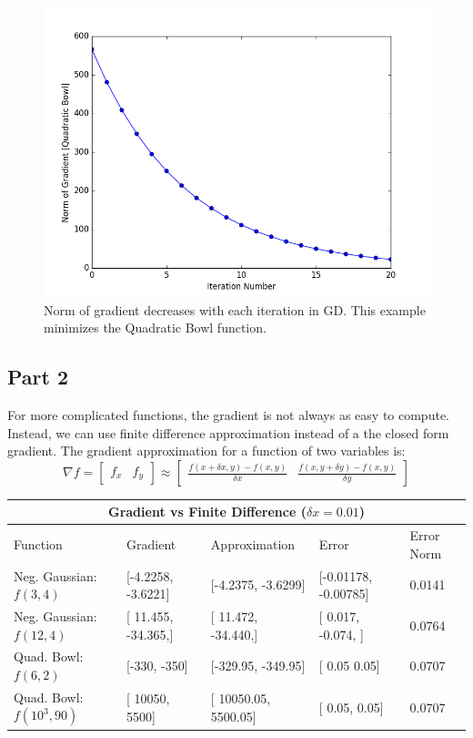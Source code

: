 \begin{figure}
	\centering
	\includegraphics [trim=0 0 0 0, clip, angle=0, width=0.8\columnwidth,
	keepaspectratio]{figures/1_1_gradient}
	\caption{Norm of gradient decreases with each iteration in GD. This example minimizes the Quadratic Bowl function.} 
	\label{fig:gradient} 
\end{figure}


\subsection{Part 2}
For more complicated functions, the gradient is not always as easy to compute.
Instead, we can use finite difference approximation instead of a the closed form gradient.
The gradient approximation for a function of two variables is:
\begin{equation}
\nabla f = \begin{bmatrix}
	f_x & f_y
\end{bmatrix}
\approx \begin{bmatrix}
	\frac{f(x+\delta x, y) - f(x,y)}{\delta x} & \frac{f(x, y+\delta y) - f(x,y)}{\delta y}
\end{bmatrix}
\end{equation}

\begin{table}[t]
  \centering
	\begin{tabular}{|p{3cm}||p{3cm}|p{3cm}|p{3cm}|p{3cm}|}
	 \hline
	 \multicolumn{5}{|c|}{Gradient vs Finite Difference ($\delta x = 0.01$)} \\
	 \hline
	 Function & Gradient & Approximation & Error &Error Norm \\
	 \hline
	 Neg. Gaussian: $f(3,4)$ & [-4.2258, -3.6221] & [-4.2375, -3.6299] & [-0.01178, -0.00785] & 0.0141 \\
	 Neg. Gaussian: $f(12,4)$ & [ 11.455, -34.365,] & [ 11.472, -34.440,] & [ 0.017, -0.074, ] & 0.0764 \\
	 Quad. Bowl: $f(6,2)$ & [-330, -350] & [-329.95, -349.95] & [ 0.05  0.05] & 0.0707\\
	 Quad. Bowl: $f(10^3,90)$ & [ 10050, 5500] & [ 10050.05, 5500.05] & [ 0.05, 0.05] & 0.0707 \\
	 \hline
	\end{tabular}
\end{table}\label{table:gradient}

